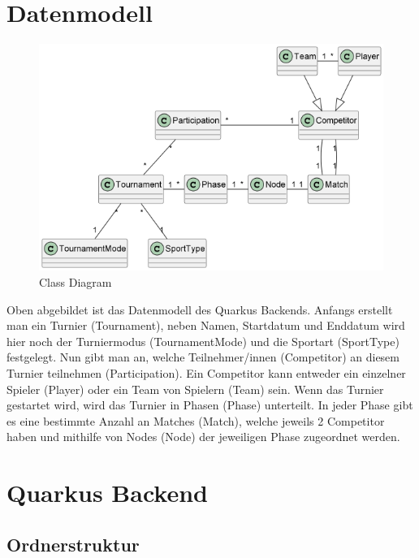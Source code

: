 \section{Datenmodell}

\begin{figure}[H]
    \includegraphics[scale=1]{pics/class_diagram.png}
    \caption{Class Diagram}
\end{figure}

Oben abgebildet ist das Datenmodell des Quarkus Backends. Anfangs erstellt man ein Turnier (Tournament), neben Namen, Startdatum und Enddatum 
wird hier noch der Turniermodus (TournamentMode) und die Sportart (SportType) festgelegt. Nun gibt man an, welche Teilnehmer/innen (Competitor) an diesem Turnier teilnehmen (Participation). 
Ein Competitor kann entweder ein einzelner Spieler (Player) oder ein Team von Spielern (Team) sein.
Wenn das Turnier gestartet wird, wird das Turnier in Phasen (Phase) unterteilt. In jeder Phase gibt es eine bestimmte Anzahl an Matches (Match), welche jeweils 2 Competitor haben und mithilfe von Nodes (Node) 
der jeweiligen Phase zugeordnet werden.

\section{Quarkus Backend}

\subsection{Ordnerstruktur}

